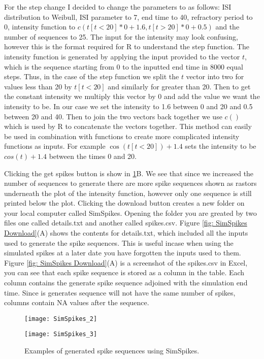 \documentclass[../main.tex]{subfiles}
\begin{document}
For the step change I decided to change the parameters to as follows: ISI distribution to Weibull, ISI parameter to 7, end time to 40, refractory period to 0, intensity function to $c\left(t\left[t < 20 \right]*0 +1.6, t\left[t > 20 \right]*0 +0.5  \right)$ and the number of sequences to 25. The input for the intensity may look confusing, however this is the format required for R to understand the step function. The intensity function is generated by applying the input provided to the vector $t$, which is the sequence starting from $0$ to the inputted end time in 8000 equal steps. Thus, in the case of the step function we split the $t$ vector into two for values less than 20 by $t\left[t < 20 \right]$ and similarly for greater than 20. Then to get the constant intensity we multiply this vector by $0$ and add the value we want the intensity to be. In our case we set the intensity to 1.6 between 0 and 20 and 0.5 between 20 and 40. Then to join the two vectors back together we use $c()$ which is used by R to concatenate the vectors together. This method can easily be used in combination with functions to create more complicated intensity functions as inputs. For example $\cos \left( t\left[t < 20 \right] \right) + 1.4$ sets the intensity to be $cos(t) +1.4$ between the times 0 and 20. 

	Clicking the get spikes button is show in \ref{fig: SimSpikes example}B. We see that since we increased the number of sequences to generate there are more spike sequences shown as rastors underneath the plot of the intensity function, however only one sequence is still printed below the plot. Clicking the download button creates a new folder on your local computer called SimSpikes. Opening the folder you are greated by two files one called {details.txt} and another called {spikes.csv}. Figure \ref{fig: SimSpikes Download}(A) shows the contents for {details.txt}, which included all the inputs used to generate the spike sequences. This is useful incase when using the simulated spikes at a later date you have forgotten the inputs used to them. Figure \ref{fig: SimSpikes Download}(A) is a screenshot of the {spikes.csv} in Excel, you can see that each spike sequence is stored as a column in the table. Each column contains the generate spike sequence adjoined with the simulation end time. Since is generates sequence will not have the same number of spikes, columns contain NA values after the sequence.


\begin{figure}
	\begin{subfloat}[]{
	\texttt{[image: SimSpikes\_2]}}
	\end{subfloat}
	\begin{subfloat}[]{
	\texttt{[image: SimSpikes\_3]}}
	\end{subfloat}	
		\caption{Examples of generated spike sequences using {SimSpikes}. }
\label{fig: SimSpikes example}
\end{figure}
\end{document}

